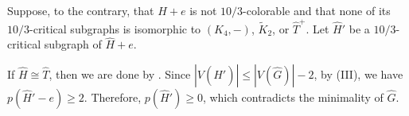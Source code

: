 \documentclass[11pt,a4paper]{article}
\makeatletter
\renewenvironment{proof}[1][\proofname]{\par
	\pushQED{\qed}%
	\normalfont \topsep6\p@\@plus6\p@\relax
	\trivlist
	\item[\hskip\labelsep
	\bfseries
	#1\@addpunct{.}]\ignorespaces
}{%
	\popQED\endtrivlist\@endpefalse
}
\theoremstyle{definition}
\makeatother
\begin{document}
\begin{proof}
	Suppose, to the contrary, that $\widehat{H}+e$ is not $10/3$-colorable and that none of its $10/3$-critical subgraphs is isomorphic to $(K_4,-)$, $\widetilde{K}_2$, or $\widehat{T}^+$. Let $\widehat{H}'$ be a $10/3$-critical subgraph of $\widehat{H}+e$.

	
	If $\widehat{H}\cong \widehat{T}$, then we are done by . Since $|V(\widehat{H}')|\leq |V(\widehat{G})|-2$, by (III), we have $p(\widehat{H}'-e)\geq 2$. Therefore,  $p(\widehat{H}')\geq 0$, which contradicts the minimality of  $\widehat{G}$.
\end{proof}

\end{document}
